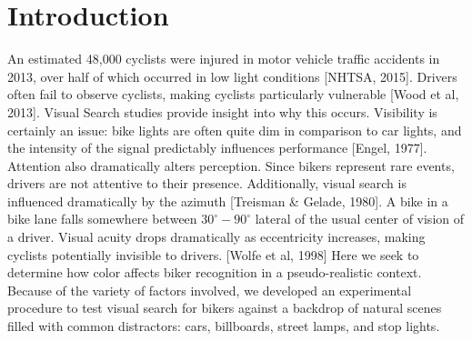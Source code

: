 \section{Introduction}



An estimated 48,000 cyclists were injured in motor vehicle traffic accidents in
2013, over half of which occurred in low light conditions [NHTSA, 2015].
Drivers often fail to observe cyclists, making cyclists particularly vulnerable
[Wood et al, 2013]. Visual Search studies provide insight into why this occurs.
Visibility is certainly an issue: bike lights are often quite dim in comparison
to car lights, and the intensity of the signal predictably influences
performance [Engel, 1977]. Attention also dramatically alters perception. Since
bikers represent rare events, drivers are not attentive to their presence.
Additionally, visual search is influenced dramatically by the azimuth [Treisman
\& Gelade, 1980]. A bike in a bike lane falls somewhere between
$30^\circ-90^\circ$ lateral of the usual center of vision of a driver.
Visual acuity drops dramatically as eccentricity increases, making cyclists
potentially invisible to drivers. [Wolfe et al, 1998] Here we seek to
determine how color affects biker recognition in a pseudo-realistic
context. Because of the variety of factors involved, we developed an
experimental procedure to test visual search for bikers against a backdrop
of natural scenes filled with common distractors: cars, billboards, street
lamps, and stop lights.
